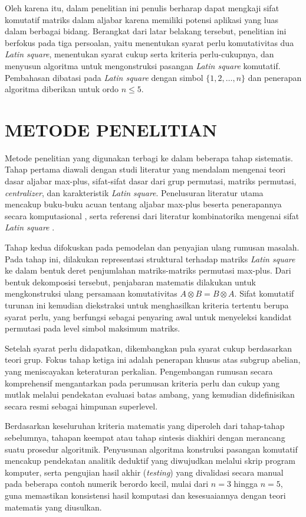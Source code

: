 \documentclass[journal]{IEEEtran}
\theoremstyle{definition}
\theoremstyle{plain}
\begin{document}
Oleh karena itu, dalam penelitian ini penulis berharap dapat mengkaji sifat komutatif matriks dalam aljabar karena memiliki potensi aplikasi yang luas dalam berbagai bidang. Berangkat dari latar belakang tersebut, penelitian ini berfokus pada tiga persoalan, yaitu menentukan syarat perlu komutativitas dua \textit{Latin square}, menentukan syarat cukup serta kriteria perlu-cukupnya, dan menyusun algoritma untuk mengonstruksi pasangan \textit{Latin square} komutatif. Pembahasan dibatasi pada \textit{Latin square} dengan simbol $\{1,2,\ldots,n\}$ dan penerapan algoritma diberikan untuk ordo $n\leq 5$.

\section{METODE PENELITIAN}
Metode penelitian yang digunakan terbagi ke dalam beberapa tahap sistematis. Tahap pertama diawali dengan studi literatur yang mendalam mengenai teori dasar aljabar max-plus, sifat-sifat dasar dari grup permutasi, matriks permutasi, \textit{centralizer}, dan karakteristik \textit{Latin square}. Penelusuran literatur utama mencakup buku-buku acuan tentang aljabar max-plus beserta penerapannya secara komputasional \cite{subiono2015minmaxplus}, serta referensi dari literatur kombinatorika mengenai sifat \textit{Latin square} \cite{george2017introductioncombinatorics}.

Tahap kedua difokuskan pada pemodelan dan penyajian ulang rumusan masalah. Pada tahap ini, dilakukan representasi struktural terhadap matriks \textit{Latin square} ke dalam bentuk deret penjumlahan matriks-matriks permutasi max-plus. Dari bentuk dekomposisi tersebut, penjabaran matematis dilakukan untuk mengkonstruksi ulang persamaan komutativitas $A \otimes B = B \otimes A$. Sifat komutatif turunan ini kemudian diekstraksi untuk menghasilkan kriteria tertentu berupa syarat perlu, yang berfungsi sebagai penyaring awal untuk menyeleksi kandidat permutasi pada level simbol maksimum matriks.

Setelah syarat perlu didapatkan, dikembangkan pula syarat cukup berdasarkan teori grup. Fokus tahap ketiga ini adalah penerapan khusus atas subgrup abelian, yang meniscayakan keteraturan perkalian. Pengembangan rumusan secara komprehensif mengantarkan pada perumusan kriteria perlu dan cukup yang mutlak melalui pendekatan evaluasi batas ambang, yang kemudian didefinisikan secara resmi sebagai himpunan superlevel.

Berdasarkan keseluruhan kriteria matematis yang diperoleh dari tahap-tahap sebelumnya, tahapan keempat atau tahap sintesis diakhiri dengan merancang suatu prosedur algoritmik. Penyusunan algoritma konstruksi pasangan komutatif mencakup pendekatan analitik deduktif yang diwujudkan melalui skrip program komputer, serta pengujian hasil akhir (\textit{testing}) yang divalidasi secara manual pada beberapa contoh numerik berordo kecil, mulai dari $n = 3$ hingga $n = 5$, guna memastikan konsistensi hasil komputasi dan kesesuaiannya dengan teori matematis yang diusulkan.
\end{document}
